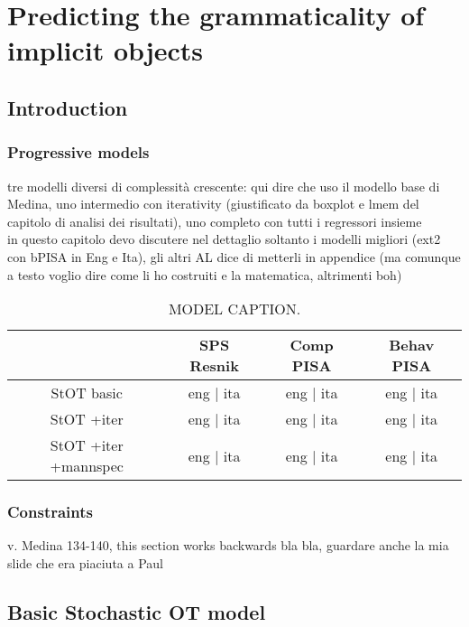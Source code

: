 \setchapterpreamble[u]{\margintoc}
\chapter{Predicting the grammaticality of implicit objects}

\section{Introduction} 

\subsection{Progressive models} 

tre modelli diversi di complessità crescente: qui dire che uso il modello base di Medina, uno intermedio con iterativity (giustificato da boxplot e lmem del capitolo di analisi dei risultati), uno completo con tutti i regressori insieme\\

in questo capitolo devo discutere nel dettaglio soltanto i modelli migliori (ext2 con bPISA in Eng e Ita), gli altri AL dice di metterli in appendice (ma comunque a testo voglio dire come li ho costruiti e la matematica, altrimenti boh)

\begin{table}[htb] %
\caption{MODEL CAPTION.}
\begin{tabular}{cccc}
& SPS Resnik & Comp PISA & Behav PISA \\
\hline
StOT basic & eng | ita          & eng | ita   & eng | ita   \\
StOT +iter & eng | ita  & eng | ita & eng | ita \\
StOT +iter +mannspec & eng | ita   & eng | ita   & eng | ita  
\end{tabular}
\end{table}


\subsection{Constraints} 

v. Medina 134-140, this section works backwards bla bla, guardare anche la mia slide che era piaciuta a Paul


\section{Basic Stochastic OT model} 


